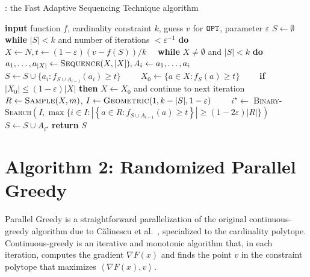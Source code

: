 \documentclass[11pt, a4paper]{article}
\begin{document}

\begin{algorithm}[H]
\caption{\algoptimized: the Fast Adaptive Sequencing Technique algorithm}
\begin{algorithmic}
    \STATE \textbf{input}  function $f$, cardinality constraint $k$, guess $v$ for $\texttt{OPT}$, parameter $\varepsilon$
    \STATE 	 $S \leftarrow \emptyset $
    \STATE  \textbf{while} $|S| < k$ and number of  iterations  $< \varepsilon^{-1}$ \textbf{do}
    \STATE   \ \  $X \leftarrow N,  t \leftarrow (1-\varepsilon) (v - f(S))/k$
	\STATE   \ \ \textbf{while} $X \neq \emptyset$ and $|S| < k$  \textbf{do}
	\STATE  \ \ \ \   $a_1, \ldots, a_{|X|} \leftarrow \textsc{Sequence}(X, |X|), A_i \leftarrow a_1, \ldots, a_i$
	\STATE \ \ \ \   $S \leftarrow S \cup \{a_i : f_{S \cup A_{i-1}}(a_i) \geq t \}$
	\STATE \ \ \ \ $X_0 \leftarrow \{a \in X : f_{S}(a) \geq t\}$
	\STATE \ \ \ \   \textbf{if} $|X_0| \leq (1 - \varepsilon) |X|$ \textbf{then} $X \leftarrow X_0$ and continue to  next iteration
	\STATE \ \ \ \  $R \leftarrow \textsc{Sample}(X, m)$, $I \leftarrow \textsc{Geometric}(1, k - |S|, 1 - \varepsilon)$
    \STATE \ \ \ \  $i^{\star} \leftarrow$ \textsc{Binary-Search}$(I,  \max \{i  \in I : |\left\{a \in R : f_{S \cup A_{i-1}}(a) \geq   t \right\}| \geq (1 - 2 \varepsilon) |R|\})$ 
	\STATE \ \ \ \  $S \leftarrow S \cup A_{i^{\star} }$
    	\STATE \textbf{return} $S$
  \end{algorithmic}
  \label{alg:main}
\end{algorithm}
\section{Algorithm 2: Randomized Parallel Greedy}
Parallel Greedy is a straightforward parallelization of the original continuous-greedy algorithm due to Călinescu et al.~\cite{CGC11}, specialized to the cardinality polytope. Continuous-greedy is an iterative and monotonic algorithm that, in each iteration, computes the gradient $\nabla F(x)$ and finds the point $v$ in the constraint polytope that maximizes
$\left<\nabla F(x), v\right>$. 
\end{document}
